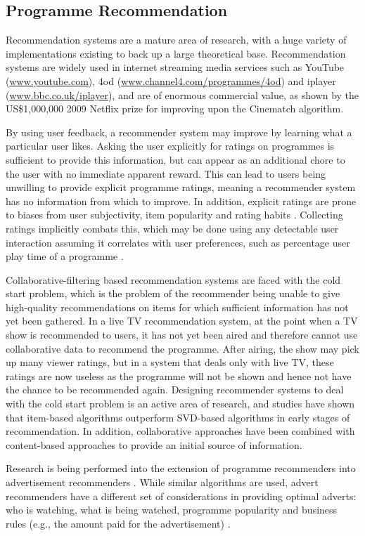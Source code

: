 
	\subsection{Programme Recommendation}

	Recommendation systems are a mature area of research, with a huge variety of implementations existing to back up a large theoretical base. Recommendation systems are widely used in internet streaming media services such as YouTube (\url{www.youtube.com}), 4od (\url{www.channel4.com/programmes/4od}) and iplayer (\url{www.bbc.co.uk/iplayer}), and are of enormous commercial value, as shown by the US\$1,000,000 2009 Netflix prize \citep{pragmatic_chaos} for improving upon the Cinematch algorithm.

	By using user feedback, a recommender system may improve by learning what a particular user likes. Asking the user explicitly for ratings on programmes is sufficient to provide this information, but can appear as an additional chore to the user with no immediate apparent reward. This can lead to users being unwilling to provide explicit programme ratings, meaning a recommender system has no information from which to improve. In addition, explicit ratings are prone to biases from user subjectivity, item popularity and rating habits \citep[p.~304]{recommender-systems-handbook}. Collecting ratings implicitly combats this, which may be done using any detectable user interaction assuming it correlates with user preferences, such as percentage user play time of a programme \citep[p.~305]{recommender-systems-handbook}.

	Collaborative-filtering based recommendation systems are faced with the cold start problem, which is the problem of the recommender being unable to give high-quality recommendations on items for which sufficient information has not yet been gathered. In a live TV recommendation system, at the point when a TV show is recommended to users, it has not yet been aired and therefore cannot use collaborative data to recommend the programme. After airing, the show may pick up many viewer ratings, but in a system that deals only with live TV, these ratings are now useless as the programme will not be shown and hence not have the chance to be recommended again. Designing recommender systems to deal with the cold start problem is an active area of research, and studies have shown that item-based algorithms outperform SVD-based algorithms in early stages of recommendation\cite{cold-start-problem}. In addition, collaborative approaches have been combined with content-based approaches to provide an initial source of information\cite{generative_models}.

	Research is being performed into the extension of programme recommenders into advertisement recommenders \cite{contextual_advertising}. While similar algorithms are used, advert recommenders have a different set of considerations in providing optimal adverts: who is watching, what is being watched, programme popularity and business rules (e.g., the amount paid for the advertisement) \cite{contextual_advertising}.


